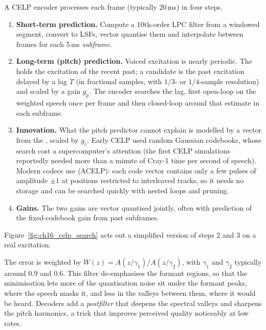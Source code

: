 A CELP encoder processes each frame (typically 20\,ms) in four steps.
\begin{enumerate}[nosep]
\item \textbf{Short-term prediction.} Compute a 10th-order LPC filter from a windowed segment,
convert to LSFs, vector quantise them and interpolate between frames for each 5\,ms
\emph{subframe}.
\item \textbf{Long-term (pitch) prediction.} Voiced excitation is nearly periodic. The
 holds the excitation of the recent past; a candidate is the past excitation
delayed by a lag $T$ (in fractional samples, with $1/3$- or $1/4$-sample resolution) and scaled by a
gain $g_p$. The encoder searches the lag, first open-loop on the weighted speech once per frame and
then closed-loop around that estimate in each subframe.
\item \textbf{Innovation.} What the pitch predictor cannot explain is modelled by a vector from the
, scaled by $g_c$. Early CELP used random Gaussian codebooks, whose search cost a
supercomputer's attention (the first CELP simulations reportedly needed more than a minute of
Cray-1 time per second of speech). Modern codecs use  (ACELP): each code vector
contains only a few pulses of amplitude $\pm1$ at positions restricted to interleaved tracks, so it
needs no storage and can be searched quickly with nested loops and pruning.
\item \textbf{Gains.} The two gains are vector quantised jointly, often with prediction of the
fixed-codebook gain from past subframes.
\end{enumerate}
Figure~\ref{fig:ch16_celp_search} acts out a simplified version of steps 2 and 3 on a real excitation.


The error is weighted by $W(z)=A(z/\gamma_1)/A(z/\gamma_2)$, with $\gamma_1$ and $\gamma_2$ typically
around 0.9 and 0.6. This filter de-emphasises the formant regions, so that the minimisation lets more
of the quantisation noise sit under the formant peaks, where the speech masks it, and less in the
valleys between them, where it would be heard. Decoders add a \emph{postfilter} that deepens the
spectral valleys and sharpens the pitch harmonics, a trick that improves perceived quality
noticeably at low rates.

